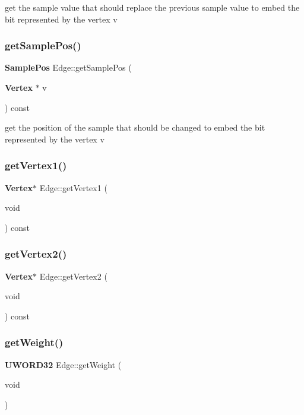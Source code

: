 get the sample value that should replace the previous sample value to embed the bit represented by the vertex v \mbox{\label{classEdge_ae8ada19820ea7633f6b3f5cfad67bff8}} 
\subsubsection{get\+Sample\+Pos()}
{\footnotesize\ttfamily \textbf{ Sample\+Pos} Edge\+::get\+Sample\+Pos (\begin{DoxyParamCaption}\item[{\textbf{ Vertex} $\ast$}]{v }\end{DoxyParamCaption}) const}

get the position of the sample that should be changed to embed the bit represented by the vertex v \mbox{\label{classEdge_a3f5a5ae4404a59f4346f48b497c682ae}} 
\subsubsection{get\+Vertex1()}
{\footnotesize\ttfamily \textbf{ Vertex}$\ast$ Edge\+::get\+Vertex1 (\begin{DoxyParamCaption}\item[{void}]{ }\end{DoxyParamCaption}) const\hspace{0.3cm}{\ttfamily [inline]}}

\mbox{\label{classEdge_a60a4db1ce179dc036d8398672c9cde90}} 
\subsubsection{get\+Vertex2()}
{\footnotesize\ttfamily \textbf{ Vertex}$\ast$ Edge\+::get\+Vertex2 (\begin{DoxyParamCaption}\item[{void}]{ }\end{DoxyParamCaption}) const\hspace{0.3cm}{\ttfamily [inline]}}

\mbox{\label{classEdge_ac2da75a813dcd04c2af4da2180418d12}} 
\subsubsection{get\+Weight()}
{\footnotesize\ttfamily \textbf{ U\+W\+O\+R\+D32} Edge\+::get\+Weight (\begin{DoxyParamCaption}\item[{void}]{ }\end{DoxyParamCaption})}


